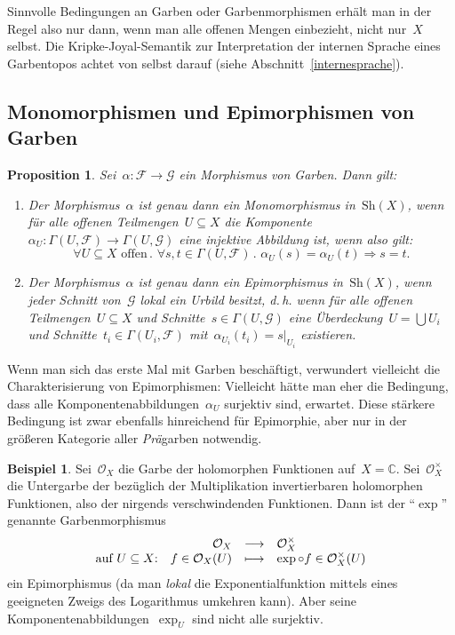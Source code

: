 \documentclass[a4paper,ngerman,12pt]{scrartcl}
\theoremstyle{definition}
\newtheorem{bsp}[defn]{Beispiel}
\theoremstyle{plain}
\newtheorem{prop}[defn]{Proposition}
\theoremstyle{remark}
\newcommand{\CC}{\mathbb{C}}
\newcommand{\F}{\mathcal{F}}
\newcommand{\G}{\mathcal{G}}
\renewcommand{\O}{\mathcal{O}}
\newcommand{\Sh}{\mathrm{Sh}}
\renewcommand{\_}{\mathpunct{.}\,}
\newcommand{\?}{\,{:}\,}
\begin{document}
Sinnvolle Bedingungen an Garben oder Garbenmorphismen erhält man in der Regel
also nur dann, wenn man alle offenen Mengen einbezieht, nicht nur~$X$ selbst.
Die Kripke-Joyal-Semantik zur Interpretation der internen Sprache eines
Garbentopos achtet von selbst darauf (siehe Abschnitt~\ref{internesprache}).


\subsection{Monomorphismen und Epimorphismen von Garben}

\begin{prop}Sei~$\alpha : \F \to \G$ ein Morphismus von Garben. Dann gilt:
\begin{enumerate}
\item Der Morphismus~$\alpha$ ist genau dann ein Monomorphismus in~$\Sh(X)$,
wenn für alle offenen Teilmengen~$U \subseteq X$ die Komponente~$\alpha_U :
\Gamma(U,\F) \to \Gamma(U,\G)$ eine injektive Abbildung ist, wenn also gilt:
\[ \forall \text{$U \subseteq X$ offen}\_
  \forall s,t \in \Gamma(U,\F)\_
  \alpha_U(s) = \alpha_U(t) \Rightarrow s = t. \]
\item Der Morphismus~$\alpha$ ist genau dann ein Epimorphismus in~$\Sh(X)$,
wenn jeder Schnitt von~$\G$ \emph{lokal} ein Urbild besitzt, d.\,h. wenn für
alle offenen Teilmengen~$U \subseteq X$ und Schnitte~$s \in \Gamma(U,\G)$ eine
Überdeckung~$U = \bigcup U_i$ und Schnitte~$t_i \in \Gamma(U_i,\F)$
mit~$\alpha_{U_i}(t_i) = s|_{U_i}$ existieren.
\end{enumerate}
\end{prop}

Wenn man sich das erste Mal mit Garben beschäftigt, verwundert vielleicht die
Charakterisierung von Epimorphismen: Vielleicht hätte man eher die
Bedingung, dass alle Komponentenabbildungen~$\alpha_U$ surjektiv sind,
erwartet. Diese stärkere Bedingung ist zwar ebenfalls hinreichend für Epimorphie,
aber nur in der größeren Kategorie aller \emph{Prä}garben notwendig.

\begin{bsp}Sei~$\O_X$ die Garbe der holomorphen Funktionen auf~$X = \CC$.
Sei~$\O_X^\times$ die Untergarbe der bezüglich der Multiplikation
invertierbaren holomorphen Funktionen, also der nirgends verschwindenden
Funktionen. Dann ist der "`$\exp$"' genannte Garbenmorphismus
\[ \begin{array}{@{}rrcl@{}}
           & \O_X &\longrightarrow& \O_X^\times \\
  \text{auf $U \subseteq X$:} & f \in \O_X(U) &\longmapsto& \exp \circ f \in
  \O_X^\times(U)
\end{array} \]
ein Epimorphismus (da man \emph{lokal} die Exponentialfunktion mittels eines
geeigneten Zweigs des Logarithmus umkehren kann). Aber seine
Komponentenabbildungen~$\exp_U$ sind nicht alle surjektiv.\end{bsp}
\end{document}
